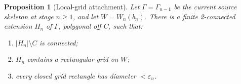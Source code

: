 \documentclass[11pt]{article}
\theoremstyle{mainplain}
\theoremstyle{mainroman}
\newtheorem{longproposition}[theorem]{Proposition}
\theoremstyle{definition}
\providecommand{\tightlist}{\setlength{\itemsep}{0pt}\setlength{\parskip}{0pt}}
\numberwithin{equation}{section}
\begin{document}
\begin{longproposition}[Local-grid attachment]\label{prop:local-grid-attachment}
Let \(\Gamma=\Gamma_{n-1}\) be the current source skeleton at stage \(n\ge1\), and let \(W=W_n(b_n)\). There is a finite 2-connected extension \(H_n\) of \(\Gamma\), polygonal off \(C\), such that:

\begin{enumerate}
\def\labelenumi{\arabic{enumi}.}
\tightlist
\item
  \(|H_n|\setminus C\) is connected;
\item
  \(H_n\) contains a rectangular grid on \(W\);
\item
  every closed grid rectangle has diameter \(<\varepsilon_n\).
\end{enumerate}
\end{longproposition}
\end{document}
